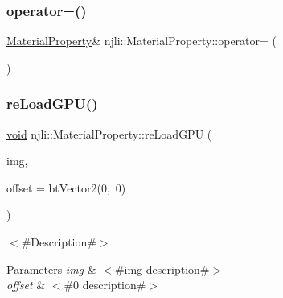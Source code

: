\subsubsection{\texorpdfstring{operator=()}{operator=()}}
{\footnotesize\ttfamily \mbox{\hyperlink{classnjli_1_1_material_property}{Material\+Property}}\& njli\+::\+Material\+Property\+::operator= (\begin{DoxyParamCaption}\item[{const \mbox{\hyperlink{classnjli_1_1_material_property}{Material\+Property}} \&}]{ }\end{DoxyParamCaption})\hspace{0.3cm}{\ttfamily [protected]}}

\mbox{\label{classnjli_1_1_material_property_adb0972e7a2a81e22c59252d609ed4134}} 
\subsubsection{\texorpdfstring{re\+Load\+G\+P\+U()}{reLoadGPU()}\hspace{0.1cm}{\footnotesize\ttfamily [1/2]}}
{\footnotesize\ttfamily \mbox{\hyperlink{_thread_8h_af1e856da2e658414cb2456cb6f7ebc66}{void}} njli\+::\+Material\+Property\+::re\+Load\+G\+PU (\begin{DoxyParamCaption}\item[{const \mbox{\hyperlink{classnjli_1_1_image}{Image}} \&}]{img,  }\item[{const bt\+Vector2 \&}]{offset = {\ttfamily btVector2(0,~0)} }\end{DoxyParamCaption})}

$<$\#\+Description\#$>$


\begin{DoxyParams}{Parameters}
{\em img} & $<$\#img description\#$>$ \\
\hline
{\em offset} & $<$\#0 description\#$>$ \\
\hline
\end{DoxyParams}
\mbox{\label{classnjli_1_1_material_property_abb3e55b3f32ba67f6e52b3a1af5672be}} 
